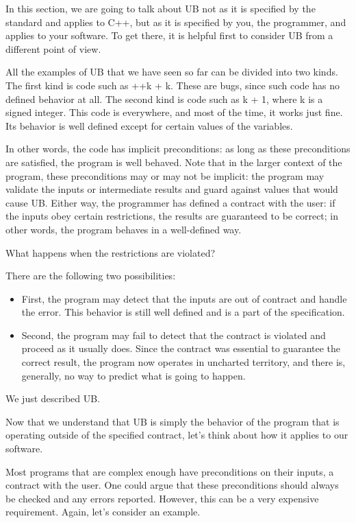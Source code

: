 In this section, we are going to talk about UB not as it is specified by the standard and applies to C++, but as it is specified by you, the programmer, and applies to your software. To get there, it is helpful first to consider UB from a different point of view. 

All the examples of UB that we have seen so far can be divided into two kinds. The first kind is code such as ++k + k. These are bugs, since such code has no defined behavior at all. The second kind is code such as k + 1, where k is a signed integer. This code is everywhere, and most of the time, it works just fine. Its behavior is well defined except for certain values of the variables.

In other words, the code has implicit preconditions: as long as these preconditions are satisfied, the program is well behaved. Note that in the larger context of the program, these preconditions may or may not be implicit: the program may validate the inputs or intermediate results and guard against values that would cause UB. Either way, the programmer has defined a contract with the user: if the inputs obey certain restrictions, the results are guaranteed to be correct; in other words, the program behaves in a well-defined way.

What happens when the restrictions are violated?

There are the following two possibilities:

\begin{itemize}
\item 
First, the program may detect that the inputs are out of contract and handle the error. This behavior is still well defined and is a part of the specification.

\item 
Second, the program may fail to detect that the contract is violated and proceed as it usually does. Since the contract was essential to guarantee the correct result, the program now operates in uncharted territory, and there is, generally, no way to predict what is going to happen.
\end{itemize}

We just described UB.

Now that we understand that UB is simply the behavior of the program that is operating outside of the specified contract, let's think about how it applies to our software.

Most programs that are complex enough have preconditions on their inputs, a contract with the user. One could argue that these preconditions should always be checked and any errors reported. However, this can be a very expensive requirement. Again, let's consider an example.

